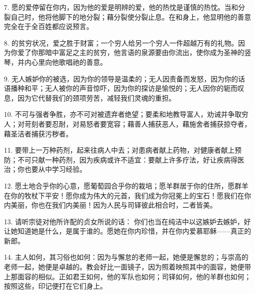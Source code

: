 7. 愿的爱停留在你内，因为他的爱是明辨的爱，他的热忱是谨慎的热忱。当和分裂自己时，他将他脚下的地分裂；藉分裂使分裂止息。在和身上，他显明他的善意完全在于全百姓都应说预言。\par

8. 的贫穷状况，爱之胜于财富；一个穷人给另一个穷人一件超越万有的礼物。因为你爱了你那暗中富足之主的贫穷，他言语的泉源要由你流出，使你成为圣神的竖琴，并内心里向他歌唱祂的善意。\par

9. 无人嫉妒你的被选，因为你的领导是温柔的；无人因责备而发怒，因为你的话语播种和平；无人被你的声音惊吓，因为你的探访是愉悦的；无人因你的轭而叹息，因为它代替我们的颈项劳苦，减轻我们灵魂的重担。\par

10. 不可与强者争胜，亦不可对被遗弃者绝望；要柔和地教导富人，劝诫并争取穷人；对苛刻者要忍耐，对易怒者要宽容；藉善人捕获恶人，藉施舍者捕获掠夺者，藉圣洁者捕获污秽者。\par

11. 要带上一万种药剂，起来往病人中去；对患病者献上药物，对健康者献上预防；不可只献一种药剂，因为疾病或许不适宜：要献上许多疗法，好让疾病得医治；你也要从中学习经验。\par

12. 愿土地合乎你的心意，愿葡萄园合乎你的栽培；愿羊群居于你的住所，愿群羊在你的牧杖下平安！愿你成为伟大的元首，我们成为你冠冕上的宝石！愿我们在你内美丽，你也在我们内美丽！因为人民与司铎彼此相合时，二者皆美。\par

13. 请听宗徒对他所许配的贞女所说的话： 你们也当在纯洁中以这嫉妒去嫉妒，好让她知道她是什么，是属于谁的。愿她在你内珍惜，并在你内爱慕耶稣——真正的新郎。\par

14. 主人如何，其习俗也如何：因为与懈怠的老师一起，她便是懈怠的；与崇高的老师一起，她便是卓越的。教会好比一面镜子，因为照着映照其中的面容，她便带上那面容的相似。正如君王如何，他的军队也如何；司铎如何，他的羊群也如何；按照这些，印记便打在它们身上。\par

